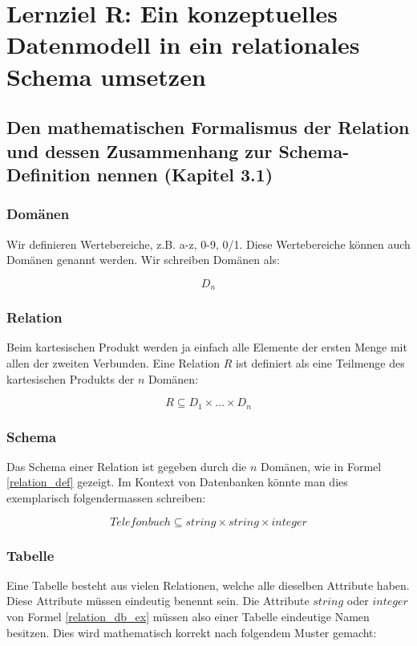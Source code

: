 \section{Lernziel R: Ein konzeptuelles Datenmodell in ein relationales Schema umsetzen}

\subsection{Den mathematischen Formalismus der Relation und dessen Zusammenhang zur Schema-Definition nennen (Kapitel 3.1)}

\subsubsection{Domänen}
Wir definieren Wertebereiche, z.B. a-z, 0-9, 0/1. Diese Wertebereiche können auch Domänen genannt werden. Wir schreiben Domänen als:

\begin{equation}
    D_{n}
\end{equation}

\subsubsection{Relation}
Beim kartesischen Produkt werden ja einfach alle Elemente der ersten Menge mit allen der zweiten Verbunden. Eine Relation \(R\) ist definiert als eine Teilmenge des kartesischen Produkts der \(n\) Domänen:

\begin{equation}\label{relation_def}
    R \subseteq D_{1} \times \dots \times D_{n}
\end{equation}

\subsubsection{Schema}
Das Schema einer Relation ist gegeben durch die \(n\) Domänen, wie in Formel \eqref{relation_def} gezeigt. Im Kontext von Datenbanken könnte man dies exemplarisch folgendermassen schreiben:

\begin{equation}\label{relation_db_ex}
    Telefonbuch \subseteq string \times string \times integer
\end{equation}

\subsubsection{Tabelle}
Eine Tabelle besteht aus vielen Relationen, welche alle dieselben Attribute haben. Diese Attribute müssen eindeutig benennt sein.
Die Attribute \(string\) oder \(integer\) von Formel \eqref{relation_db_ex} müssen also einer Tabelle eindeutige Namen besitzen. Dies wird mathematisch korrekt nach folgendem Muster gemacht:

